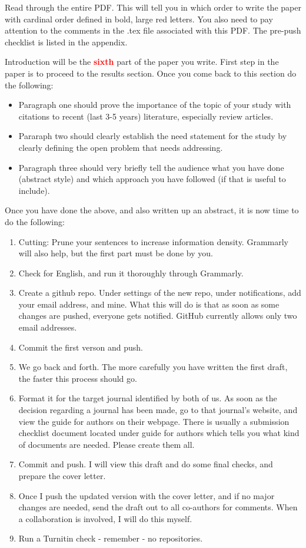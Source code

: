 \documentclass[12pt,twocolumn]{article}
\begin{document}
Read through the entire PDF. This will tell you in which order to write the paper with cardinal order defined in bold, large red letters. You also need to pay attention to the comments in the .tex file associated with this PDF. The pre-push checklist is listed in the appendix.

Introduction will be the \textbf{\Huge \textcolor{red}{sixth}} part of the paper you write. First step in the paper is to proceed to the results section. Once you come back to this section do the following:

\begin{itemize}
\item Paragraph one should prove the importance of the topic of your study with citations to recent (last 3-5 years) literature, especially review articles.
\item Pararaph two should clearly establish the need statement for the study by clearly defining the open problem that needs addressing.
\item Paragraph three should very briefly tell the audience what you have done (abstract style) and which approach you have followed (if that is useful to include).
\end{itemize}

Once you have done the above, and also written up an abstract, it is now time to do the following:

\begin{enumerate}
\item Cutting: Prune your sentences to increase information density. Grammarly will also help, but the first part must be done by you.
\item Check for English\cite{burchfield:1998,strunk:2000}, and run it thoroughly through Grammarly.
\item Create a github repo. Under settings of the new repo, under notifications, add your email address, and mine. What this will do is that as soon as some changes are pushed, everyone gets notified. GitHub currently allows only two email addresses.
\item Commit the first verson and push.
\item We go back and forth. The more carefully you have written the first draft, the faster this process should go.
\item Format it for the target journal identified by both of us. As soon as the decision regarding a journal has been made, go to that journal's website, and view the guide for authors on their webpage. There is usually a submission checklist document located under guide for authors which tells you what kind of documents are needed. Please create them all.
\item Commit and push. I will view this draft and do some final checks, and prepare the cover letter.
\item Once I push the updated version with the cover letter, and if no major changes are needed, send the draft out to all co-authors for comments. When a collaboration is involved, I will do this myself.
\item Run a Turnitin check - remember - no repositories.
\end{enumerate}
\end{document}

